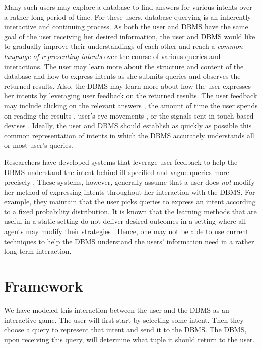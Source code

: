 \documentclass{article}
\begin{document}
Many such users may explore a database to find answers for various intents over a rather long period of time. For these users, database querying is an inherently interactive and continuing process. As both the user and DBMS have the same goal of the user receiving her desired information, the user and DBMS would like to gradually improve their understandings of each other and reach a {\it common language of representing intents} over the course of various queries and interactions. The user may learn more about the structure and content of the database and how to express intents as she submits queries and observes the returned results. Also, the DBMS may learn more about how the user expresses her intents by leveraging user feedback on the returned results. The user feedback may include clicking on the relevant answers \cite{Yue:2012:KDB:2240304.2240501}, the amount of time the user spends on reading the results \cite{Granka:2004:EAU:1008992.1009079}, user's eye movements \cite{Huang:2012:USU:2207676.2208591}, or the signals sent in touch-based devises \cite{DBLP:conf/icde/LiarouI14}. Ideally, the user and DBMS should establish as quickly as possible this common representation of intents in which the DBMS accurately understands all or most user's queries.

Researchers have developed systems that leverage user feedback to help the DBMS understand the intent behind ill-specified and vague queries more precisely \cite{Chaudhuri:2006:PIR:1166074.1166085,Chatzopoulou:2009:QRI:1561638.1561642}. These systems, however, generally assume that a user does {\it not} modify her method of expressing intents throughout her interaction with the DBMS. For example, they maintain that the user picks queries to express an intent according to a fixed probability distribution. It is known that the learning methods that are useful in a static setting do not deliver desired outcomes in a setting where all agents may modify their strategies \cite{Grotov:2016:OLR:2911451.2914798,Daskalakis:2010:LAN:1929237.1929248}. Hence, one may not be able to use current techniques to help the DBMS understand the users' information need in a rather long-term interaction.

\section{Framework}
\label{sec:framework}
We have modeled this interaction between the user and the DBMS as an interactive game. The user will first start by selecting some intent. Then they choose a query to represent that intent and send it to the DBMS. The DBMS, upon receiving this query, will determine what tuple it should return to the user. 
\end{document}
